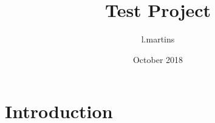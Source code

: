 \documentclass{article}
\title{Test Project}
\author{l.martins }
\date{October 2018}
\begin{document}
\maketitle

\section{Introduction}


\end{document}
